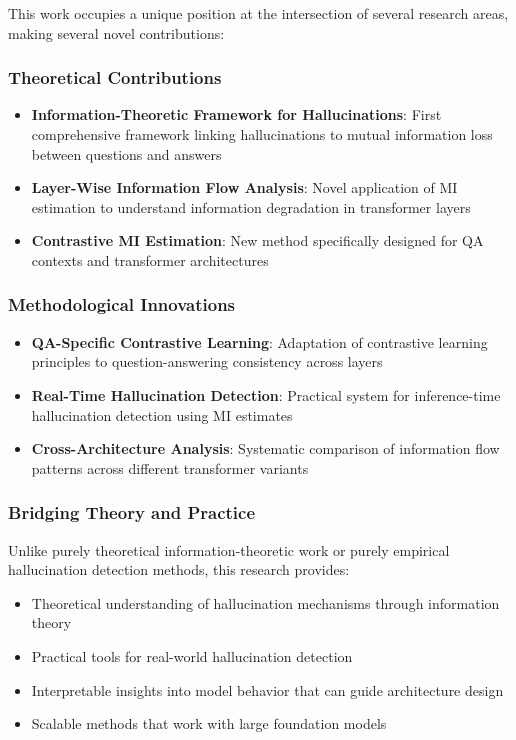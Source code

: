 This work occupies a unique position at the intersection of several research areas, making several novel contributions:

\subsubsection{Theoretical Contributions}
\begin{itemize}
    \item \textbf{Information-Theoretic Framework for Hallucinations}: First comprehensive framework linking hallucinations to mutual information loss between questions and answers
    \item \textbf{Layer-Wise Information Flow Analysis}: Novel application of MI estimation to understand information degradation in transformer layers
    \item \textbf{Contrastive MI Estimation}: New method specifically designed for QA contexts and transformer architectures
\end{itemize}

\subsubsection{Methodological Innovations}
\begin{itemize}
    \item \textbf{QA-Specific Contrastive Learning}: Adaptation of contrastive learning principles to question-answering consistency across layers
    \item \textbf{Real-Time Hallucination Detection}: Practical system for inference-time hallucination detection using MI estimates
    \item \textbf{Cross-Architecture Analysis}: Systematic comparison of information flow patterns across different transformer variants
\end{itemize}

\subsubsection{Bridging Theory and Practice}
Unlike purely theoretical information-theoretic work or purely empirical hallucination detection methods, this research provides:
\begin{itemize}
    \item Theoretical understanding of hallucination mechanisms through information theory
    \item Practical tools for real-world hallucination detection
    \item Interpretable insights into model behavior that can guide architecture design
    \item Scalable methods that work with large foundation models
\end{itemize}

